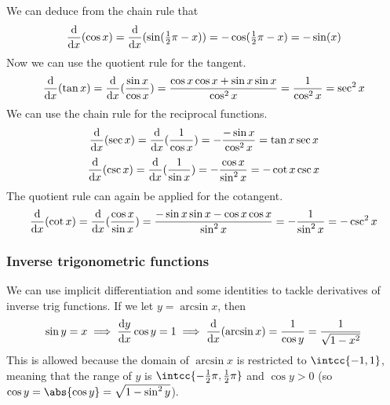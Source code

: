 We can deduce from the chain rule that
\begin{equation*}
    \dv{x}(\cos x) = \dv{x}(\sin(\tfrac 12 \pi - x))
                     = -\cos(\tfrac 12 \pi - x) = -\sin(x)
\end{equation*}
Now we can use the quotient rule for the tangent.
\begin{equation*}
    \dv{x}(\tan x) = \dv{x}(\frac{\sin x}{\cos x})
                     = \frac{\cos x \cos x + \sin x \sin x}{\cos^2 x}
                     = \frac 1{\cos^2 x} = \sec^2 x
\end{equation*}
We can use the chain rule for the reciprocal functions.
\begin{equation*}
    \dv{x}(\sec x) = \dv{x}(\frac 1{\cos x}) = -\frac{-\sin x}{\cos^2 x}
                     = \tan x \sec x
\end{equation*}
\begin{equation*}
\dv{x}(\csc x) = \dv{x}(\frac 1{\sin x}) = -\frac{\cos x}{\sin^2 x}
    = -\cot x \csc x
\end{equation*}
The quotient rule can again be applied for the cotangent.
\begin{equation*}
\dv{x}(\cot x) = \dv{x}(\frac{\cos x}{\sin x})
    = \frac{-\sin x \sin x - \cos x \cos x}{\sin^2 x}
    = -\frac 1{\sin^2 x} = -\csc^2 x
\end{equation*}

\subsubsection{Inverse trigonometric functions} \label{sec_calc_trig_inv}

We can use implicit differentiation and some identities to tackle
derivatives of inverse trig functions. If we let \(y = \arcsin x\), then
\begin{equation*}
\sin y = x \implies \dv<y>{x} \cos y = 1
    \implies \dv{x}(\arcsin x) = \frac 1{\cos y} = \frac 1{\sqrt{1 - x^2}}
\end{equation*}
This is allowed because the domain of \(\arcsin x\) is restricted to
\(\intcc{-1, 1}\), meaning that the range of \(y\) is
\(\intcc{-\frac 12 \pi, \frac 12 \pi}\) and \(\cos y > 0\)
(so \(\cos y = \abs{\cos y} = \sqrt{1 - \sin^2 y}\)).

